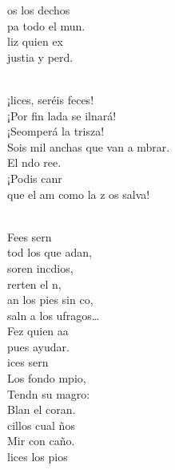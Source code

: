 \documentclass[12pt]{article}
\begin{document}
\begin{multicols*}{2}
\begin{cancion}
	os los dechos\\
	pa todo el mun.\\
	liz quien ex\\
	justia y perd. \\\jump\\
	\begin{chorus}%
	¡lices, seréis feces! \\
	¡Por fin lada se ilnará!\\
	¡Seomperá la trisza!\\
	Sois mil anchas que van a mbrar.\\
	El ndo ree.\\
	¡Podis canr\\
	que el am como la z os salva!\\
	\end{chorus}%
	\jump\\
	Fees sern\\
	tod los que adan,\\
	soren incdios,\\
	rerten el n,\\
	an los pies sin co,\\
	saln a los ufragos… \\
	Fez quien aa\\
	pues  ayudar.\\
\jump
	ices sern\\
	Los  fondo mpio,\\
	Tendn su magro:\\
	Blan el coran. \\
	cillos cual ños\\
	Mir con caño.\\
	lices los pios\\

\end{cancion}
\end{multicols*}
\end{document}
